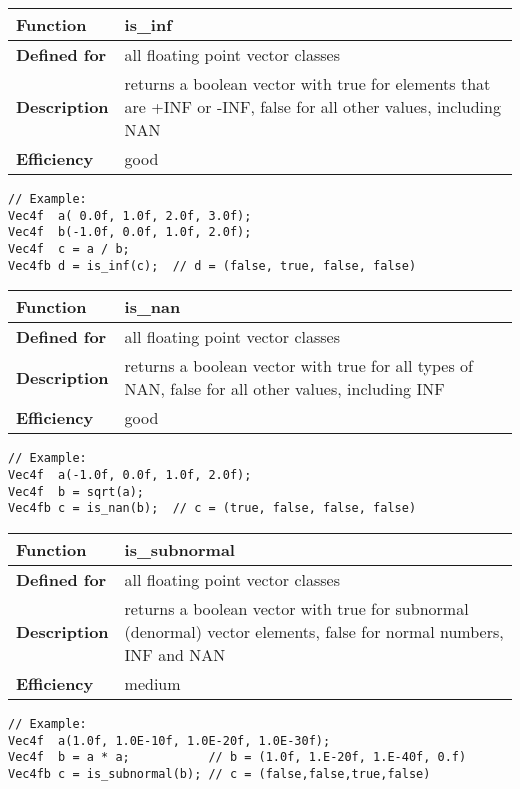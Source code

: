\documentclass[vcl_manual.tex]{subfiles}
\begin{document}
\begin{tabular}{|p{25mm}|p{100mm}|}
\hline
\bfseries Function & is\_inf \\ \hline
\bfseries Defined for & all floating point vector classes \\ \hline
\bfseries Description & returns a boolean vector with true for elements that are +INF or -INF, false for all other values, including NAN \\ \hline
\bfseries Efficiency & good \\ \hline
\end{tabular}
\begin{lstlisting}[frame=none]
// Example:
Vec4f  a( 0.0f, 1.0f, 2.0f, 3.0f);
Vec4f  b(-1.0f, 0.0f, 1.0f, 2.0f);
Vec4f  c = a / b;
Vec4fb d = is_inf(c);  // d = (false, true, false, false)
\end{lstlisting}


\begin{tabular}{|p{25mm}|p{100mm}|}
\hline
\bfseries Function & is\_nan \\ \hline
\bfseries Defined for & all floating point vector classes \\ \hline
\bfseries Description & returns a boolean vector with true for all types of NAN, false for all other values, including INF \\ \hline
\bfseries Efficiency & good \\ \hline
\end{tabular}
\begin{lstlisting}[frame=none]
// Example:
Vec4f  a(-1.0f, 0.0f, 1.0f, 2.0f);
Vec4f  b = sqrt(a);
Vec4fb c = is_nan(b);  // c = (true, false, false, false)
\end{lstlisting}


\begin{tabular}{|p{25mm}|p{100mm}|}
\hline
\bfseries Function & is\_subnormal \\ \hline
\bfseries Defined for & all floating point vector classes \\ \hline
\bfseries Description & returns a boolean vector with true for subnormal (denormal) vector elements, false for normal numbers, INF and NAN \\ \hline
\bfseries Efficiency & medium \\ \hline
\end{tabular}
\begin{lstlisting}[frame=none]
// Example:
Vec4f  a(1.0f, 1.0E-10f, 1.0E-20f, 1.0E-30f);
Vec4f  b = a * a;           // b = (1.0f, 1.E-20f, 1.E-40f, 0.f)
Vec4fb c = is_subnormal(b); // c = (false,false,true,false)
\end{lstlisting}
\end{document}
